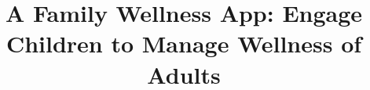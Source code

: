 \documentclass{sig-alternate}
\begin{document}
\setlength{\parindent}{0pt}
%

\title{A Family Wellness App: Engage Children to Manage Wellness of Adults}
%
%
%
%
%
\end{document}
